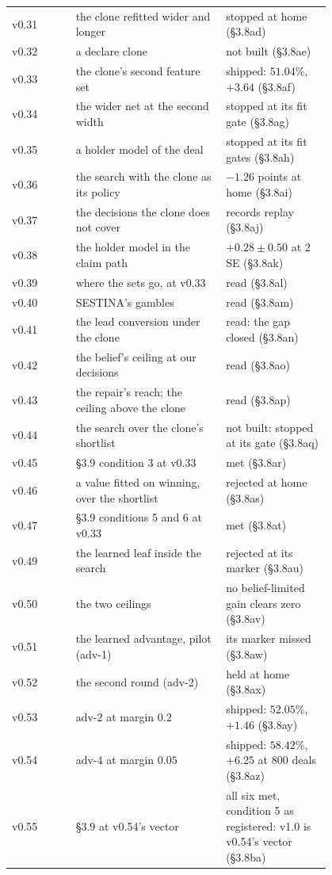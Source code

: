 \documentclass[11pt]{article}
\newcommand{\sect}[1]{\S#1}
\newcommand{\VAcceptOutcome}{all six met, condition 5 as registered: v1.0 is v0.54's vector}
\begin{document}
\begin{longtable}{@{}l>{\raggedright\arraybackslash}p{0.47\linewidth}>{\raggedright\arraybackslash}p{0.33\linewidth}@{}}
v0.31 & the clone refitted wider and longer & stopped at home (\sect{3.8ad}) \\
v0.32 & a declare clone & not built (\sect{3.8ae}) \\
v0.33 & the clone's second feature set & shipped: $51.04\%$, $+3.64$ (\sect{3.8af}) \\
v0.34 & the wider net at the second width & stopped at its fit gate (\sect{3.8ag}) \\
v0.35 & a holder model of the deal & stopped at its fit gates (\sect{3.8ah}) \\
v0.36 & the search with the clone as its policy & $-1.26$ points at home (\sect{3.8ai}) \\
v0.37 & the decisions the clone does not cover & records replay (\sect{3.8aj}) \\
v0.38 & the holder model in the claim path & $+0.28 \pm 0.50$ at 2 SE (\sect{3.8ak}) \\
v0.39 & where the sets go, at v0.33 & read (\sect{3.8al}) \\
v0.40 & SESTINA's gambles & read (\sect{3.8am}) \\
v0.41 & the lead conversion under the clone & read: the gap closed (\sect{3.8an}) \\
v0.42 & the belief's ceiling at our decisions & read (\sect{3.8ao}) \\
v0.43 & the repair's reach; the ceiling above the clone & read (\sect{3.8ap}) \\
v0.44 & the search over the clone's shortlist & not built: stopped at its gate (\sect{3.8aq}) \\
v0.45 & \sect{3.9} condition 3 at v0.33 & met (\sect{3.8ar}) \\
v0.46 & a value fitted on winning, over the shortlist & rejected at home (\sect{3.8as}) \\
v0.47 & \sect{3.9} conditions 5 and 6 at v0.33 & met (\sect{3.8at}) \\
v0.49 & the learned leaf inside the search & rejected at its marker (\sect{3.8au}) \\
v0.50 & the two ceilings & no belief-limited gain clears zero (\sect{3.8av}) \\
v0.51 & the learned advantage, pilot (adv-1) & its marker missed (\sect{3.8aw}) \\
v0.52 & the second round (adv-2) & held at home (\sect{3.8ax}) \\
v0.53 & adv-2 at margin $0.2$ & shipped: $52.05\%$, $+1.46$ (\sect{3.8ay}) \\
v0.54 & adv-4 at margin $0.05$ & shipped: $58.42\%$, $+6.25$ at 800 deals (\sect{3.8az}) \\
v0.55 & \sect{3.9} at v0.54's vector & \VAcceptOutcome{} (\sect{3.8ba}) \\
\bottomrule
\end{longtable}
\end{document}
